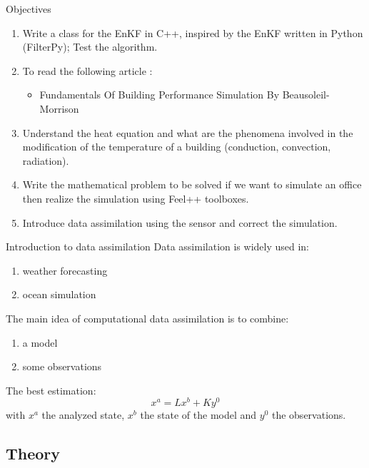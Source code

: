 

\begin{frame}{Objectives}
		
    \begin{enumerate}[\textbullet]
        \item Write a class for the EnKF in C++, inspired by the EnKF written in Python (FilterPy); Test the algorithm.
        \item To read the following article :
        \begin{itemize}
            \item Fundamentals Of Building Performance Simulation By Beausoleil-Morrison
        \end{itemize}
        
    \item Understand the heat equation and what are the phenomena involved in the modification of the temperature of a building (conduction, convection, radiation).
    \item Write the mathematical problem to be solved if we want to simulate an office then realize the simulation using Feel++ toolboxes.
    \item Introduce data assimilation using the sensor and correct the simulation.
    \end{enumerate}
\end{frame}




\begin{frame}{Introduction to data assimilation}
Data assimilation is widely used in:
\begin{enumerate}[\textbullet]
       \item weather forecasting
       \item ocean simulation
\end{enumerate}	 
      The main idea of computational data assimilation is to combine:
\begin{enumerate}[\textbullet]
       \item a model
       \item some observations
\end{enumerate}	 
The best estimation:
$$x^a=Lx^b+Ky^0$$
with $x^a$ the analyzed state, $x^b$ the state of the model and $y^0$ the observations.
\end{frame}
\subsection{Theory}
   
